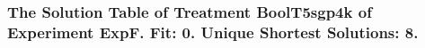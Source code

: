  \begin{frame}
 \fontsize{8pt}{9pt}\selectfont
 \frametitle{ The Solution Table of Treatment BoolT5sgp4k of Experiment ExpF. Fit: 0. Unique Shortest Solutions: 8. }

 \label{ExpFSolutionTable005.tex}  
 \end{frame}

